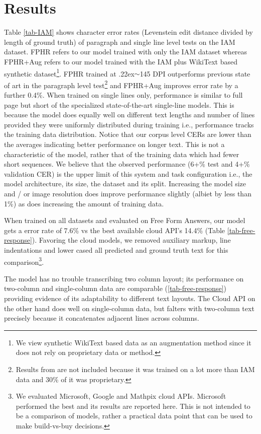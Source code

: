 \documentclass[runningheads]{llncs}
\newcommand{\tilda}{\raise.22ex\hbox{$\scriptstyle\sim$}}
\begin{document}
\section{Results}
Table \ref{tab-IAM} shows character error rates (Levenstein edit distance divided by length of ground truth) of paragraph and single line level tests on the IAM dataset. FPHR refers to our model trained with only the IAM dataset whereas FPHR+Aug refers to our model trained with the IAM plus WikiText based synthetic dataset\footnote{We view synthetic WikiText based data as an augmentation method since it does not rely on proprietary data or method.}.
FPHR trained at \tilda 145 DPI outperforms previous state of art in the paragraph level test\footnote{Results from \citep{8270042} are not included because it was trained on a lot more than IAM  data and 30\% of it was proprietary.} and FPHR+Aug improves error rate by a further 0.4\%.
When trained on single lines only, performance is similar to full page but short of the specialized state-of-the-art single-line models. This is because the model does equally well on different text lengths and number of lines provided they were uniformly distributed during training i.e., performance tracks the training data distribution. Notice that our corpus level CERs are lower than the averages indicating better performance on longer text. This is not a characteristic of the model, rather that of the training data which had fewer short sequences. We believe that the observed performance (6+\% test and 4+\% validation CER) is the upper limit of this system and task configuration i.e., the model architecture, its size, the dataset and its split. Increasing the model size and / or image resolution does improve performance slightly (albiet by less than 1\%) as does increasing the amount of training data.

When trained on all datasets and evaluated on Free Form Answers, our model gets a error rate of 7.6\% vs the best available cloud API's 14.4\% (Table \ref{tab-free-response}). Favoring the cloud models, we removed auxiliary markup, line indentations and lower cased all predicted and ground truth text for this comparison\footnote{We evaluated Microsoft, Google and Mathpix cloud APIs. Microsoft performed the best and its results are reported here. This is not intended to be a comparison of models, rather a practical data point that can be used to make build-vs-buy decisions.}.

The model has no trouble transcribing two column layout; its performance on two-column and single-column data are comparable (\autoref{tab-free-response}) providing evidence of its adaptability to different text layouts. The Cloud API on the other hand does well on single-column data, but falters with two-column text precisely because it concatenates adjacent lines across columns.
\end{document}
